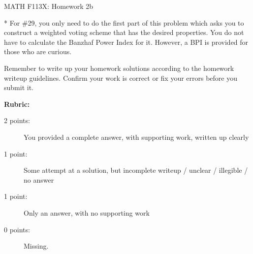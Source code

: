 \documentclass[11pt, oneside]{article}
\begin{document}
\begin{center} {\Large{MATH F113X: Homework 2b}} \end{center}
\vspace{.3in}

* For \#29, you only need to do the first part of this problem which
asks you to construct a weighted voting scheme that has the desired
properties. You do not have to calculate the Banzhaf Power Index for
it. However, a BPI is provided for those who are curious.

\vspace{2cm}
Remember to write up your homework solutions according to the homework
writeup guidelines. Confirm your work is correct or fix your errors
before you submit it.
\vspace{1cm}

\textbf{Rubric:}

\begin{description}
\item[2 points:] You provided a complete answer, with supporting work, written up clearly
\item[1 point:] Some attempt at a solution, but incomplete writeup / unclear / illegible / no answer
\item[1 point:] Only an answer, with no supporting work 
\item[0 points:] Missing.
\end{description}
\end{document}
